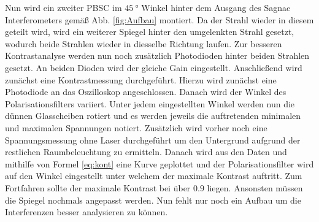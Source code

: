  Nun wird ein zweiter PBSC im $\SI{45}{\degree}$ Winkel hinter dem Ausgang des Sagnac Interferometers gemäß Abb. \ref{fig:Aufbau} montiert. Da der Strahl wieder in diesem geteilt wird, wird ein weiterer Spiegel hinter den umgelenkten Strahl gesetzt, wodurch beide Strahlen wieder in diesselbe Richtung laufen. Zur besseren Kontrastanalyse werden nun noch zusätzlich Photodioden hinter beiden Strahlen gesetzt. An beiden Dioden wird der gleiche Gain eingestellt.
 Anschließend wird zunächst eine Kontrastmessung durchgeführt. Hierzu wird zunächst eine Photodiode an das Oszilloskop angeschlossen. Danach wird der Winkel des Polarisationsfilters variiert. Unter jedem eingestellten Winkel werden nun die dünnen Glasscheiben rotiert und es werden jeweils die auftretenden minimalen und maximalen Spannungen notiert. Zusätzlich wird vorher noch eine Spannungsmessung ohne Laser durchgeführt um den Untergrund aufgrund der restlichen Raumbeleuchtung zu ermitteln. Danach wird aus den Daten und mithilfe von Formel \ref{eq:kont} eine Kurve geplottet und der Polarisationsfilter wird auf den Winkel eingestellt unter welchem der maximale Kontrast auftritt. Zum Fortfahren sollte der maximale Kontrast bei über $0.9$ liegen. Ansonsten müssen die Spiegel nochmals angepasst werden. 
Nun fehlt nur noch ein Aufbau um die Interferenzen besser analysieren zu können.
